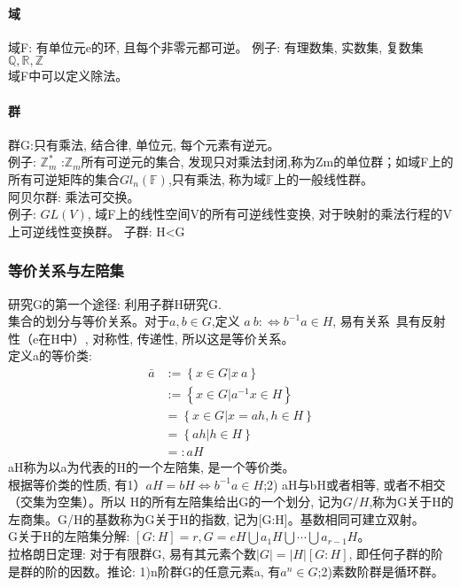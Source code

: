 \documentclass[UTF8]{../09-Mathematics}
\begin{document}
\paragraph{域}


域F: 有单位元e的环, 且每个非零元都可逆。
例子: 有理数集, 实数集, 复数集$\mathbb {Q,R,Z}$\\
域F中可以定义除法。



\paragraph{群}

群G:只有乘法, 结合律, 单位元, 每个元素有逆元。\\
例子: $\mathbb Z_m^*$ :$\mathbb Z_m$所有可逆元的集合, 发现只对乘法封闭,称为Zm的单位群；如域F上的所有可逆矩阵的集合$Gl_n(\mathbb F)$,只有乘法, 称为域$\mathbb F$上的一般线性群。\\
阿贝尔群: 乘法可交换。\\
例子: $GL(V)$, 域F上的线性空间V的所有可逆线性变换, 对于映射的乘法行程的V上可逆线性变换群。
子群: H<G\\

\subsubsection{等价关系与左陪集}
研究G的第一个途径: 利用子群H研究G.\\
集合的划分与等价关系。对于$a,b \in G$,定义 $a~b:\Leftrightarrow b^{-1}a \in H$, 易有关系~具有反射性（e在H中）, 对称性, 传递性, 所以这是等价关系。\\
定义a的等价类: 
\begin{equation}
\begin{split}
\bar a  & :=\left\{ x \in G |x~a \right\}\\
        &:=\left\{ x \in G | a^{-1}x \in H \right\}\\
        &= \left\{ x\in G | x=ah,h\in H \right\}\\
        & =\left\{ ah |h \in H \right\}\\
        &=:aH
\end{split}
\end{equation}
aH称为以a为代表的H的一个左陪集, 是一个等价类。\\
根据等价类的性质, 有1）$aH=bH \Leftrightarrow b^{-1}a \in H$;2) aH与bH或者相等, 或者不相交（交集为空集）。所以 H的所有左陪集给出G的一个划分, 记为$G/H$,称为G关于H的左商集。G/H的基数称为G关于H的指数, 记为[G:H]。基数相同可建立双射。\\
G关于H的左陪集分解: $[G:H]=r, G=eH \bigcup a_1H \bigcup \cdots \bigcup a_{r-1}H$。\\
拉格朗日定理: 对于有限群G, 易有其元素个数$|G|=|H|[G:H]$, 即任何子群的阶是群的阶的因数。推论: 1)n阶群G的任意元素a, 有$a^n \in G$;2)素数阶群是循环群。
\end{document}
